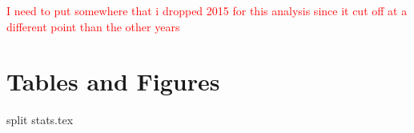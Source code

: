 \documentclass[11pt]{article}
\begin{document}
\textcolor{red}{I need to put somewhere that i dropped 2015 for this analysis since it cut off at a different point than the other years}

\renewcommand*{\bibfont}{\footnotesize}

\printbibliography

\newpage

\appendix

\section{Tables and Figures}

\begin{table}[ht]
{split stats.tex}
\end{table}
\end{document}
